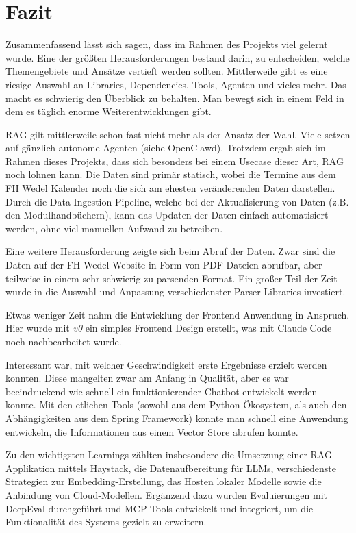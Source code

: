 \chapter{Fazit}

Zusammenfassend lässt sich sagen, dass im Rahmen des Projekts viel gelernt wurde.
Eine der größten Herausforderungen bestand darin, zu entscheiden, welche Themengebiete und Ansätze
vertieft werden sollten. Mittlerweile gibt es eine riesige Auswahl an Libraries, Dependencies, Tools,
Agenten und vieles mehr. Das macht es schwierig den Überblick zu behalten. Man bewegt sich in einem
Feld in dem es täglich enorme Weiterentwicklungen gibt.

RAG gilt mittlerweile schon fast nicht mehr als der Ansatz der Wahl. Viele setzen auf gänzlich autonome Agenten (siehe OpenClawd).
Trotzdem ergab sich im Rahmen dieses Projekts, dass sich besonders bei einem Usecase dieser Art, RAG noch 
lohnen kann. Die Daten sind primär statisch, wobei die Termine aus dem FH Wedel Kalender noch
die sich am ehesten veränderenden Daten darstellen. Durch die Data Ingestion Pipeline, welche bei der Aktualisierung
von Daten (z.B. den Modulhandbüchern), kann das Updaten der Daten einfach automatisiert werden, ohne viel
manuellen Aufwand zu betreiben.

Eine weitere Herausforderung zeigte sich beim Abruf der Daten. Zwar sind die Daten auf der FH Wedel Website
in Form von PDF Dateien abrufbar, aber teilweise in einem sehr schwierig zu parsenden Format. Ein großer Teil 
der Zeit wurde in die Auswahl und Anpassung verschiedenster Parser Libraries investiert. 

Etwas weniger Zeit nahm die Entwicklung der Frontend Anwendung in Anspruch. Hier wurde
mit \emph{v0} ein simples Frontend Design erstellt, was mit Claude Code noch nachbearbeitet wurde.

Interessant war, mit welcher Geschwindigkeit erste Ergebnisse erzielt werden konnten. Diese mangelten zwar am Anfang
in Qualität, aber es war beeindruckend wie schnell ein funktionierender Chatbot entwickelt werden konnte.
Mit den etlichen Tools (sowohl aus dem Python Ökosystem, als auch den Abhängigkeiten aus dem Spring Framework)
konnte man schnell eine Anwendung entwickeln, die Informationen aus einem Vector Store abrufen konnte.

Zu den wichtigsten Learnings zählten insbesondere die Umsetzung einer RAG-Applikation mittels
Haystack, die Datenaufbereitung für LLMs, verschiedenste Strategien zur Embedding-Erstellung,
das Hosten lokaler Modelle sowie die Anbindung von Cloud-Modellen. Ergänzend dazu wurden
Evaluierungen mit DeepEval durchgeführt und MCP-Tools entwickelt und integriert, um die
Funktionalität des Systems gezielt zu erweitern.


